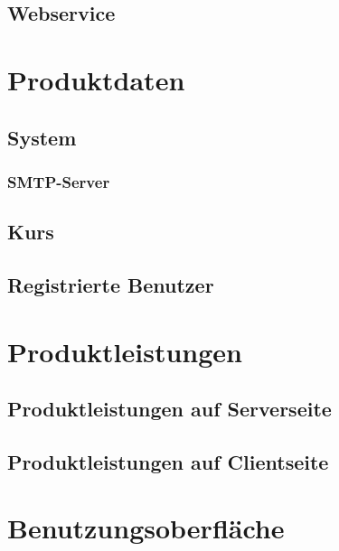 \documentclass[a4paper]{scrreprt}
\begin{document}
			
			
	\section{Webservice}
		
		

\chapter{Produktdaten}
 \label{Produktdaten}
        
	
    \section{System}
	    
	    
	    
	    \subsection{SMTP-Server}
	    
	    
	    
	    	
	\section{Kurs}
	   
	    
	    
    
    
    		
    \section{Registrierte Benutzer}
	  
	    
	    
	   
	    
    
\chapter{Produktleistungen}
	

	\section{Produktleistungen auf Serverseite}
		
	\section{Produktleistungen auf Clientseite}
	
		
		
 
\chapter{Benutzungsoberfläche}
    
\end{document}

